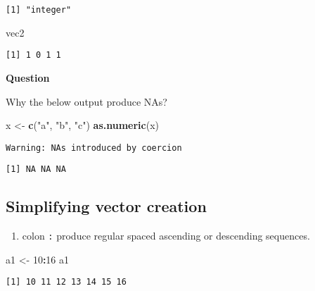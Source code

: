 \documentclass[
]{book}
\newenvironment{Shaded}{\begin{snugshade}}{\end{snugshade}}
\newcommand{\DecValTok}[1]{\textcolor[rgb]{0.00,0.00,0.81}{#1}}
\newcommand{\KeywordTok}[1]{\textcolor[rgb]{0.13,0.29,0.53}{\textbf{#1}}}
\newcommand{\NormalTok}[1]{#1}
\newcommand{\OperatorTok}[1]{\textcolor[rgb]{0.81,0.36,0.00}{\textbf{#1}}}
\newcommand{\StringTok}[1]{\textcolor[rgb]{0.31,0.60,0.02}{#1}}
\providecommand{\tightlist}{%
  \setlength{\itemsep}{0pt}\setlength{\parskip}{0pt}}
\begin{document}
\begin{verbatim}
[1] "integer"
\end{verbatim}

\begin{Shaded}
\begin{Highlighting}[]
\NormalTok{vec2}
\end{Highlighting}
\end{Shaded}

\begin{verbatim}
[1] 1 0 1 1
\end{verbatim}

\textbf{Question}

Why the below output produce NAs?

\begin{Shaded}
\begin{Highlighting}[]
\NormalTok{x <-}\StringTok{ }\KeywordTok{c}\NormalTok{(}\StringTok{"a"}\NormalTok{, }\StringTok{"b"}\NormalTok{, }\StringTok{"c"}\NormalTok{)}
\KeywordTok{as.numeric}\NormalTok{(x)}
\end{Highlighting}
\end{Shaded}

\begin{verbatim}
Warning: NAs introduced by coercion
\end{verbatim}

\begin{verbatim}
[1] NA NA NA
\end{verbatim}

\hypertarget{simplifying-vector-creation}{%
\subsection{Simplifying vector creation}\label{simplifying-vector-creation}}

\begin{enumerate}
\def\labelenumi{\arabic{enumi}.}
\tightlist
\item
  colon \texttt{:} produce regular spaced ascending or descending sequences.
\end{enumerate}

\begin{Shaded}
\begin{Highlighting}[]
\NormalTok{a1 <-}\StringTok{ }\DecValTok{10}\OperatorTok{:}\DecValTok{16}
\NormalTok{a1}
\end{Highlighting}
\end{Shaded}

\begin{verbatim}
[1] 10 11 12 13 14 15 16
\end{verbatim}
\end{document}
